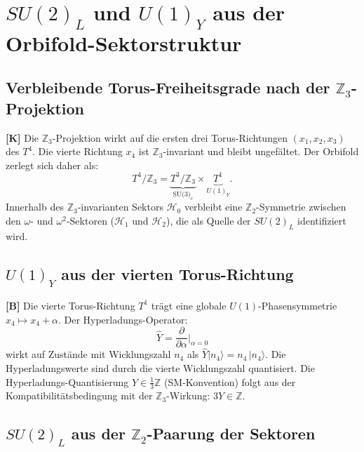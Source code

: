 \section{$SU(2)_L$ und $U(1)_Y$ aus der Orbifold-Sektorstruktur}

\subsection{Verbleibende Torus-Freiheitsgrade nach der $\mathbb{Z}_3$-Projektion}

\textbf{[K]} Die $\mathbb{Z}_3$-Projektion wirkt auf die ersten drei
Torus-Richtungen $(x_1, x_2, x_3)$ des $T^4$. Die vierte Richtung
$x_4$ ist $\mathbb{Z}_3$-invariant und bleibt ungefältet. Der Orbifold
zerlegt sich daher als:
\begin{equation}
  T^4/\mathbb{Z}_3
  = \underbrace{T^3/\mathbb{Z}_3}_{\text{SU(3)}_c}
  \times \underbrace{T^1}_{U(1)_Y}.
  \label{eq:Ttopo}
\end{equation}
Innerhalb des $\mathbb{Z}_3$-invarianten Sektors $\mathcal{H}_0$
verbleibt eine $\mathbb{Z}_2$-Symmetrie zwischen den $\omega$- und
$\omega^2$-Sektoren ($\mathcal{H}_1$ und $\mathcal{H}_2$), die als
Quelle der $SU(2)_L$ identifiziert wird.

\subsection{$U(1)_Y$ aus der vierten Torus-Richtung}

\textbf{[B]} Die vierte Torus-Richtung $T^1$ trägt eine globale
$U(1)$-Phasensymmetrie $x_4 \mapsto x_4 + \alpha$. Der Hyperladungs-Operator:
\begin{equation}
  \hat{Y} = \frac{\partial}{\partial\alpha}\bigg|_{\alpha=0}
  \label{eq:Yop}
\end{equation}
wirkt auf Zustände mit Wicklungszahl $n_4$ als $\hat{Y}|n_4\rangle
= n_4\,|n_4\rangle$. Die Hyperladungswerte sind durch die vierte
Wicklungszahl quantisiert. Die Hyperladungs-Quantisierung
$Y \in \tfrac{1}{3}\mathbb{Z}$ (SM-Konvention) folgt aus der
Kompatibilitätsbedingung mit der $\mathbb{Z}_3$-Wirkung: $3Y \in \mathbb{Z}$.

\subsection{$SU(2)_L$ aus der $\mathbb{Z}_2$-Paarung der Sektoren}

